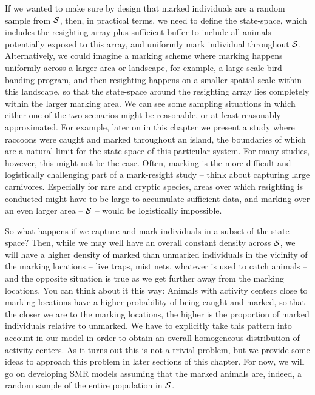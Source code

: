 If we wanted to make sure by design that marked individuals are a
random sample from ${\cal S}$, then, in practical terms, we need to
define the state-space, which includes the resighting array plus
sufficient buffer to include all animals potentially exposed to this
array, and uniformly mark individual throughout ${\cal
  S}$. Alternatively, we could imagine a marking scheme where marking
happens uniformly across a larger area or landscape, for example, a
large-scale bird banding program, and then resighting happens on a
smaller spatial scale within this landscape, so that the state-space
around the resighting array lies completely within the larger marking
area. %
We can see some sampling situations in which either one of the two
scenarios might be reasonable, or at least reasonably
approximated. For example, later on in this chapter we present a study
where raccoons were caught and marked throughout an island, the
boundaries of which are a natural limit for the state-space of this
particular system. For many studies, however, this might not be the
case. Often, marking is the more difficult and logistically
challenging part of a mark-resight study -- think about capturing
large carnivores. Especially for rare and cryptic species, areas over
which resighting is conducted might have to be large to accumulate
sufficient data, and marking over an even larger area -- ${\cal S}$ --
would be logistically impossible.


So what happens if we capture and mark individuals in a subset of the
state-space? Then, while we may well have an overall constant density
across ${\cal S}$, we will have a higher density of marked than
unmarked individuals in the vicinity of the marking locations -- live
traps, mist nets, whatever is used to catch animals -- and the
opposite situation is true as we get further away from the marking
locations. You can think about it this way: Animals with activity
centers close to marking locations have a higher probability of being
caught and marked, so that the closer we are to the marking locations,
the higher is the proportion of marked individuals relative to
unmarked. We have to explicitly take this pattern into account in our
model in order to obtain an overall homogeneous distribution of
activity centers.  As it turns out this is not a trivial problem, but
we provide some ideas to approach this problem in later sections of
this chapter. For now, we will go on developing SMR models assuming
that the marked animals are, indeed, a random sample of the entire
population in ${\cal
  S}$. %



